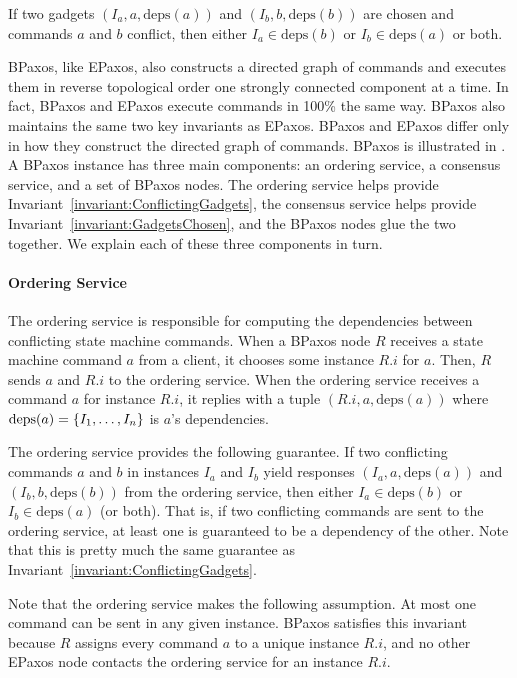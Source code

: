 \documentclass{mwhittaker}
\theoremstyle{definition}
\newcommand{\deps}[1]{\text{deps}(#1)}
\newcommand{\invlabel}[1]{\label{invariant:#1}}
\newcommand{\invref}[1]{Invariant~\ref{invariant:#1}}
\begin{document}
\begin{boxedinvariant}\invlabel{ConflictingGadgets}
  If two gadgets $(I_a, a, \deps{a})$ and $(I_b, b, \deps{b})$ are chosen and
  commands $a$ and $b$ conflict, then either $I_a \in \deps{b}$ or $I_b \in
  \deps{a}$ or both.
\end{boxedinvariant}

BPaxos, like EPaxos, also constructs a directed graph of commands and executes
them in reverse topological order one strongly connected component at a time.
In fact, BPaxos and EPaxos execute commands in 100\% the same way. BPaxos also
maintains the same two key invariants as EPaxos. BPaxos and EPaxos differ only
in how they construct the directed graph of commands.
%
BPaxos is illustrated in . A BPaxos instance has three main
components: an ordering service, a consensus service, and a set of BPaxos
nodes. The ordering service helps provide \invref{ConflictingGadgets}, the
consensus service helps provide \invref{GadgetsChosen}, and the BPaxos nodes
glue the two together. We explain each of these three components in turn.

{}

\paragraph{Ordering Service}
The ordering service is responsible for computing the dependencies between
conflicting state machine commands. When a BPaxos node $R$ receives a state
machine command $a$ from a client, it chooses some instance $R.i$ for $a$.
Then, $R$ sends $a$ and $R.i$ to the ordering service. When the ordering
service receives a command $a$ for instance $R.i$, it replies with a tuple
$(R.i, a, \deps{a})$ where $\deps{a} = \set{I_1, \ldots, I_n}$ is $a$'s
dependencies.

The ordering service provides the following guarantee. If two conflicting
commands $a$ and $b$ in instances $I_a$ and $I_b$ yield responses $(I_a, a,
\deps{a})$ and $(I_b, b, \deps{b})$ from the ordering service, then either $I_a
\in \deps{b}$ or $I_b \in \deps{a}$ (or both). That is, if two conflicting
commands are sent to the ordering service, at least one is guaranteed to be a
dependency of the other. Note that this is pretty much the same guarantee as
\invref{ConflictingGadgets}.

Note that the ordering service makes the following assumption. At most one
command can be sent in any given instance. BPaxos satisfies this invariant
because $R$ assigns every command $a$ to a unique instance $R.i$, and no other
EPaxos node contacts the ordering service for an instance $R.i$.
\end{document}
